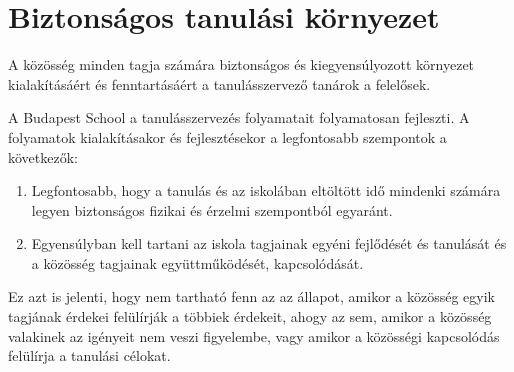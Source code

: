 \section{Biztonságos tanulási környezet}
A közösség minden tagja számára
biztonságos és kiegyensúlyozott környezet kialakításáért és fenntartásáért a
tanulásszervező tanárok a felelősek.

A Budapest School a tanulásszervezés folyamatait folyamatosan
fejleszti. A folyamatok kialakításakor és fejlesztésekor a legfontosabb
szempontok a következők:

\begin{enumerate}

      \item Legfontosabb, hogy a tanulás és az iskolában eltöltött idő mindenki
            számára legyen biztonságos fizikai és érzelmi szempontból egyaránt.

      \item Egyensúlyban kell tartani az iskola  tagjainak egyéni fejlődését és
            tanulását és a közösség tagjainak együttműködését, kapcsolódását.

\end{enumerate}
Ez azt is jelenti, hogy nem tartható fenn az az állapot, amikor a közösség
egyik tagjának érdekei felülírják a többiek érdekeit, ahogy az sem, amikor a
közösség valakinek az igényeit nem veszi figyelembe, vagy amikor a közösségi
kapcsolódás felülírja a tanulási célokat.